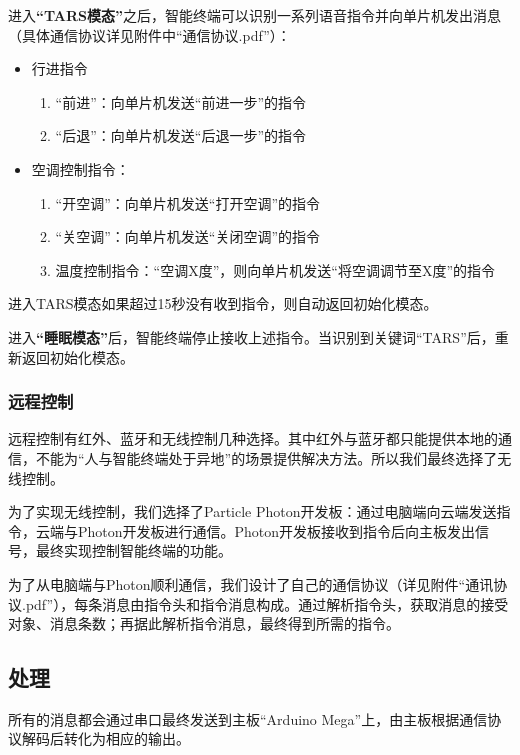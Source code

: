     \hspace{1.5em}进入\textbf{“TARS模态”}之后，智能终端可以识别一系列语音指令并向单片机发出消息（具体通信协议详见附件中“通信协议.pdf”）：
    \begin{itemize}
        \item 行进指令
        \begin{enumerate}
            \item “前进”：向单片机发送“前进一步”的指令
            \item “后退”：向单片机发送“后退一步”的指令
        \end{enumerate}
        \item 空调控制指令：
        \begin{enumerate}
            \item “开空调”：向单片机发送“打开空调”的指令
            \item “关空调”：向单片机发送“关闭空调”的指令
            \item 温度控制指令：“空调X度”，则向单片机发送“将空调调节至X度”的指令
        \end{enumerate}
    \end{itemize}
    进入TARS模态如果超过15秒没有收到指令，则自动返回初始化模态。
    \newline

    \hspace{1.5em}进入\textbf{“睡眠模态”}后，智能终端停止接收上述指令。当识别到关键词“TARS”后，重新返回初始化模态。

    \subsubsection{远程控制}
    \hspace{1.5em}远程控制有红外、蓝牙和无线控制几种选择。其中红外与蓝牙都只能提供本地的通信，不能为“人与智能终端处于异地”的场景提供解决方法。所以我们最终选择了无线控制。

    \hspace{1.5em}为了实现无线控制，我们选择了Particle Photon开发板：通过电脑端向云端发送指令，云端与Photon开发板进行通信。Photon开发板接收到指令后向主板发出信号，最终实现控制智能终端的功能。

    \hspace{1.5em}为了从电脑端与Photon顺利通信，我们设计了自己的通信协议（详见附件“通讯协议.pdf”），每条消息由指令头和指令消息构成。通过解析指令头，获取消息的接受对象、消息条数；再据此解析指令消息，最终得到所需的指令。

    \subsection{处理}
    \hspace{1.5em}所有的消息都会通过串口最终发送到主板“Arduino Mega”上，由主板根据通信协议解码后转化为相应的输出。


